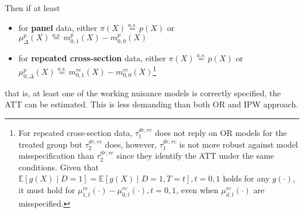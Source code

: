 \documentclass[twoside]{article}
\begin{document}
Then if at least 
\begin{itemize}
    \item for \textbf{panel} data, either $\pi(X)\overset{a.s.}{=} p(X)$ or $\mu^p_{\Delta}(X) \overset{a.s.}{=} m^p_{0,1}(X)-m^p_{0,0}(X)$
    \item for \textbf{repeated cross-section} data, either $\pi(X)\overset{a.s.}{=} p(X)$ or $\mu^p_{0,\Delta}(X) \overset{a.s.}{=} m^{rc}_{0,1}(X)-m^{rc}_{0,0}(X)$\footnote{For repeated cross-section data, $\tau^{dr,rc}_1$ does not reply on OR models for the treated group but $\tau_2^{dr,rc}$ does, however, $\tau^{dr,rc}_1$ is not more robust against model misspecification than $\tau_2^{dr,rc}$ since they identify the ATT under the same conditions. Given that $\mathbb{E}\left[g(X)\mid D=1\right] = \mathbb{E}\left[g(X)\mid D=1,T=t\right],t=0,1$ holds for any $g(\cdot)$, it must hold for $\mu^{rc}_{1,t}(\cdot)-\mu^{rc}_{0,t}(\cdot),t=0,1$, even when $\mu^{rc}_{d,t}(\cdot)$ are misspecified.} 
\end{itemize}
that is, at least one of the working nuisance models is correctly specified, the ATT can be estimated. This is less demanding than both OR and IPW approach.
\end{document}
